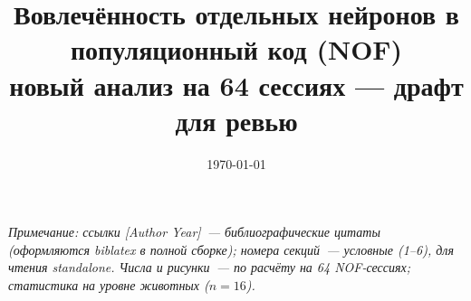 \documentclass[12pt,a4paper]{article}
\title{Вовлечённость отдельных нейронов в популяционный код (NOF)\\
       \large новый анализ на 64 сессиях --- драфт для ревью}
\author{}
\date{\today}
\begin{document}
\label{sec:nof_data}%
\label{sec:dim}%
\label{sec:v2}%
\label{sec:intense}%
\label{sec:driada}%
\label{sec:mango}%
\setcounter{section}{0}

\maketitle

\noindent\textit{Примечание: ссылки \textcolor{blue!60!black}{[Author Year]}~--- библиографические цитаты (оформляются biblatex в полной сборке); номера секций~--- условные (1--6), для чтения standalone. Числа и рисунки~--- по расчёту на 64 NOF-сессиях; статистика на уровне животных ($n=16$).}

\vspace{1em}


\end{document}
